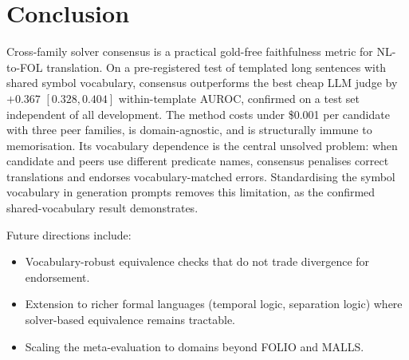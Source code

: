 \documentclass[11pt,letterpaper]{article}
\begin{document}
\section{Conclusion}
\label{sec:conclusion}

Cross-family solver consensus is a practical gold-free faithfulness metric for NL-to-FOL translation.
On a pre-registered test of templated long sentences with shared symbol vocabulary, consensus outperforms the best cheap LLM judge by $+0.367$ $[0.328, 0.404]$ within-template AUROC, confirmed on a test set independent of all development.
The method costs under \$0.001 per candidate with three peer families, is domain-agnostic, and is structurally immune to memorisation.
Its vocabulary dependence is the central unsolved problem: when candidate and peers use different predicate names, consensus penalises correct translations and endorses vocabulary-matched errors.
Standardising the symbol vocabulary in generation prompts removes this limitation, as the confirmed shared-vocabulary result demonstrates.

Future directions include:
\begin{itemize}
\item Vocabulary-robust equivalence checks that do not trade divergence for endorsement.
\item Extension to richer formal languages (temporal logic, separation logic) where solver-based equivalence remains tractable.
\item Scaling the meta-evaluation to domains beyond FOLIO and MALLS.
\end{itemize}



\end{document}
